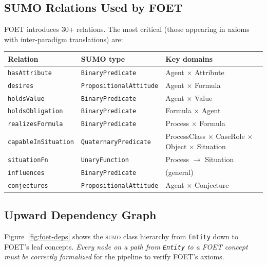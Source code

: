 \documentclass[11pt]{article}
\newcommand{\SUMO}{\textsc{sumo}}
\theoremstyle{definition}
\theoremstyle{plain}
\begin{document}
\subsection{SUMO Relations Used by FOET}

FOET introduces 30+ relations.  The most critical (those appearing in
axioms with inter-paradigm translations) are:

\begin{center}
\small
\begin{tabular}{@{}lll@{}}
\toprule
\textbf{Relation} & \textbf{SUMO type} & \textbf{Key domains} \\
\midrule
\texttt{hasAttribute} & \texttt{BinaryPredicate} & Agent $\times$ Attribute \\
\texttt{desires} & \texttt{PropositionalAttitude} & Agent $\times$ Formula \\
\texttt{holdsValue} & \texttt{BinaryPredicate} & Agent $\times$ Value \\
\texttt{holdsObligation} & \texttt{BinaryPredicate} & Formula $\times$ Agent \\
\texttt{realizes\-Formula} & \texttt{BinaryPredicate} & Process $\times$ Formula \\
\texttt{capableInSituation} & \texttt{QuaternaryPredicate} & ProcessClass $\times$ CaseRole $\times$ Object $\times$ Situation \\
\texttt{situationFn} & \texttt{UnaryFunction} & Process $\to$ Situation \\
\texttt{influences} & \texttt{BinaryPredicate} & (general) \\
\texttt{conjectures} & \texttt{PropositionalAttitude} & Agent $\times$ Conjecture \\
\bottomrule
\end{tabular}
\end{center}

\subsection{Upward Dependency Graph}

Figure~\ref{fig:foet-deps} shows the \SUMO{} class hierarchy from
\texttt{Entity} down to FOET's leaf concepts.  \emph{Every node on a
path from \texttt{Entity} to a FOET concept must be correctly
formalized} for the pipeline to verify FOET's axioms.
\end{document}
